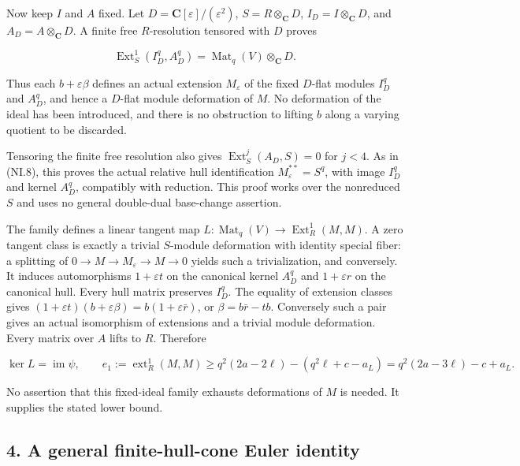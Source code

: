 Now keep \(I\) and \(A\) fixed. Let \(D=\mathbf C[\varepsilon]/(\varepsilon^2)\), \(S=R\otimes_{\mathbf C}D\),
\(I_D=I\otimes_{\mathbf C}D\), and \(A_D=A\otimes_{\mathbf C}D\). A finite free \(R\)-resolution
tensored with \(D\) proves

\[
 \operatorname{Ext}^1_S(I_D^q,A_D^q)
       =\operatorname{Mat}_q(V)\otimes_{\mathbf C}D.
 \tag{NI.13}
\]

Thus each \(b+\varepsilon\beta\) defines an actual extension \(M_{\varepsilon}\)
of the fixed \(D\)-flat modules \(I_D^q\) and \(A_D^q\), and hence a \(D\)-flat
module deformation of \(M\). No deformation of the ideal has been
introduced, and there is no obstruction to lifting \(b\) along a
varying quotient to be discarded.

Tensoring the finite free resolution also gives
\(\operatorname{Ext}^j_S(A_D,S)=0\) for \(j<4\). As in (NI.8), this proves the actual
relative hull identification \(M_\varepsilon^{**}=S^q\), with image \(I_D^q\)
and kernel \(A_D^q\), compatibly with reduction. This proof works
over the nonreduced \(S\) and uses no general double-dual base-change
assertion.

The family defines a linear tangent map
\(L:\operatorname{Mat}_q(V)\to \operatorname{Ext}^1_R(M,M)\). A zero tangent class is exactly a
trivial \(S\)-module deformation with identity special fiber: a
splitting of \(0\to M\to M_{\varepsilon}\to M\to 0\) yields such a trivialization,
and conversely. It induces automorphisms \(1+\varepsilon t\) on the
canonical kernel \(A_D^q\) and \(1+\varepsilon r\) on the canonical hull.
Every hull matrix preserves \(I_D^q\). The equality of extension
classes gives
\((1+\varepsilon t)(b+\varepsilon\beta)=b(1+\varepsilon\bar r)\), or
\(\beta=b\bar r-tb\). Conversely such a pair gives an actual
isomorphism of extensions and a trivial module deformation.
Every matrix over \(A\) lifts to \(R\). Therefore

\[
 \ker L=\operatorname{im}\psi,\qquad
 e_1:=\operatorname{ext}^1_R(M,M)
       \ge q^2(2a-2\ell)-(q^2\ell+c-a_L)
       =q^2(2a-3\ell)-c+a_L.
 \tag{NI.14}
\]

No assertion that this fixed-ideal family exhausts deformations
of \(M\) is needed. It supplies the stated lower bound.

\subsection{4. A general finite-hull-cone Euler identity}\label{SF-E849:s4}


